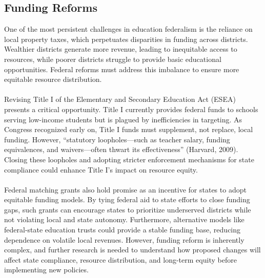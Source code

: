 \documentclass[11pt]{extarticle}
\begin{document}
\subsection{Funding Reforms}
One of the most persistent challenges in education federalism is the reliance on local property taxes, which perpetuates disparities in funding across districts. 
Wealthier districts generate more revenue, leading to inequitable access to resources, while poorer districts struggle to provide basic educational opportunities. 
Federal reforms must address this imbalance to ensure more equitable resource distribution.\\
\\
Revising Title I of the Elementary and Secondary Education Act (ESEA) presents a critical opportunity. Title I currently provides federal funds to schools serving low-income students but is plagued by inefficiencies in targeting. As Congress recognized early on, Title I funds must supplement, not replace, local funding. However, “statutory loopholes—such as teacher salary, funding equivalences, and waivers—often thwart its effectiveness” (Harvard, 2009). Closing these loopholes and adopting stricter enforcement mechanisms for state compliance could enhance Title I's impact on resource equity.\\
\\
Federal matching grants also hold promise as an incentive for states to adopt equitable funding models. By tying federal aid to state efforts to close funding gaps, such grants can encourage states to prioritize underserved districts while not violating local and state autonomy. Furthermore, alternative models like federal-state education trusts could provide a stable funding base, reducing dependence on volatile local revenues.
However, funding reform is inherently complex, and further research is needed to understand how proposed changes will affect state compliance, resource distribution, and long-term equity before implementing new policies.
\end{document}
